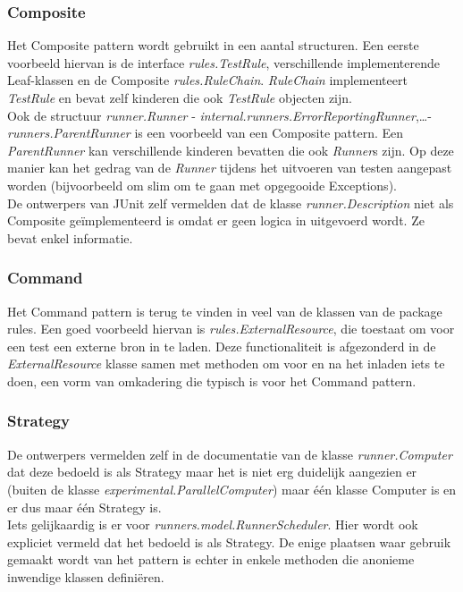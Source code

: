 \documentclass[i1]{oss}
\begin{document}
\subsubsection{Composite}
Het Composite pattern wordt gebruikt in een aantal structuren. Een eerste voorbeeld hiervan is de interface \emph{rules.TestRule}, verschillende implementerende Leaf-klassen en de Composite \emph{rules.RuleChain}. 
\emph{RuleChain} implementeert \emph{TestRule} en bevat zelf kinderen die ook \emph{TestRule} objecten zijn.
\\
Ook de structuur \emph{runner.Runner} - \emph{internal.runners.ErrorReportingRunner},\ldots - \emph{runners.ParentRunner} is een voorbeeld van een Composite pattern. 
Een \emph{ParentRunner} kan verschillende kinderen bevatten die ook \emph{Runner}s zijn. 
Op deze manier kan het gedrag van de \emph{Runner} tijdens het uitvoeren van testen aangepast worden (bijvoorbeeld om slim om te gaan met opgegooide Exceptions).
\\
De ontwerpers van JUnit zelf vermelden dat de klasse \emph{runner.Description} niet als Composite ge\"implementeerd is omdat er geen logica in uitgevoerd wordt. Ze bevat enkel informatie.

\subsubsection{Command}
Het Command pattern is terug te vinden in veel van de klassen van de package rules. 
Een goed voorbeeld hiervan is \emph{rules.ExternalResource}, die toestaat om voor een test een externe bron in te laden. 
Deze functionaliteit is afgezonderd in de \emph{ExternalResource} klasse samen met methoden om voor en na het inladen iets te doen, een vorm van omkadering die typisch is voor het Command pattern. 

\subsubsection{Strategy}
De ontwerpers vermelden zelf in de documentatie van de klasse \emph{runner.Computer} dat deze bedoeld is als Strategy maar het is niet erg duidelijk aangezien er (buiten de klasse \emph{experimental.ParallelComputer}) maar \'e\'en klasse Computer is en er dus maar \'e\'en Strategy is.
\\
Iets gelijkaardig is er voor \emph{runners.model.RunnerScheduler}. Hier wordt ook expliciet vermeld dat het bedoeld is als Strategy. De enige plaatsen waar gebruik gemaakt wordt van het pattern is echter in enkele methoden die anonieme inwendige klassen defini\"eren.
\end{document}
